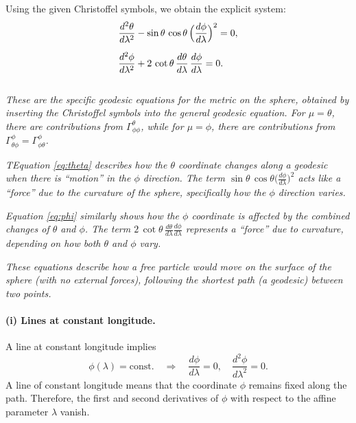 Using the given Christoffel symbols, we obtain the explicit system:
\begin{align}
\frac{d^2 \theta}{d\lambda^2}
&-\sin\theta \,\cos\theta \,\Bigl(\frac{d\phi}{d\lambda}\Bigr)^2
= 0,
\label{eq:theta}\\[6pt]
\frac{d^2 \phi}{d\lambda^2}
&+ 2 \,\cot\theta\,\frac{d\theta}{d\lambda}\,\frac{d\phi}{d\lambda}
= 0.
\label{eq:phi}
\end{align}
\\
\emph{These are the specific geodesic equations for the metric on the sphere, obtained by inserting the Christoffel symbols into the general geodesic equation. For \(\mu = \theta\), there are contributions from \(\Gamma^{\theta}_{\phi\phi}\), while for \(\mu = \phi\), there are contributions from \(\Gamma^{\phi}_{\theta\phi} = \Gamma^{\phi}_{\phi\theta}\).}

\emph{TEquation \eqref{eq:theta} describes how the \(\theta\) coordinate changes along a geodesic when there is ``motion'' in the \(\phi\) direction. The term \(\sin\theta\,\cos\theta \bigl(\tfrac{d\phi}{d\lambda}\bigr)^2\) acts like a ``force'' due to the curvature of the sphere, specifically how the \(\phi\) direction varies.}

\emph{Equation \eqref{eq:phi} similarly shows how the \(\phi\) coordinate is affected by the combined changes of \(\theta\) and \(\phi\). The term \(2 \,\cot\theta\, \tfrac{d\theta}{d\lambda} \tfrac{d\phi}{d\lambda}\) represents a ``force'' due to curvature, depending on how both \(\theta\) and \(\phi\) vary.}

\emph{These equations describe how a free particle would move on the surface of the sphere (with no external forces), following the shortest path (a geodesic) between two points.}

\paragraph{(i) Lines at constant longitude.}
A line at constant longitude implies
\[
\phi(\lambda) = \text{const.}
\quad\Longrightarrow\quad
\frac{d\phi}{d\lambda} = 0, \quad
\frac{d^2\phi}{d\lambda^2} = 0.
\]
A line of constant longitude means that the coordinate \(\phi\) remains fixed along the path. Therefore, the first and second derivatives of \(\phi\) with respect to the affine parameter \(\lambda\) vanish.

